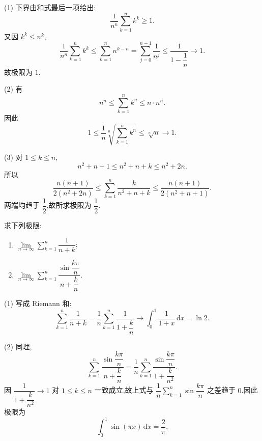 \begin{solution}

  (1) 下界由和式最后一项给出:
  \[
    \dfrac{1}{n^n}\sum\limits_{k=1}^n k^k\geq1.
  \]
  又因 $k^k\leq n^k$,
  \[
    \dfrac{1}{n^n}\sum\limits_{k=1}^n k^k
    \leq\sum\limits_{k=1}^n n^{k-n}
    =\sum\limits_{j=0}^{n-1}\dfrac{1}{n^j}
    \leq\dfrac{1}{1-\dfrac{1}{n}}\longrightarrow1.
  \]
  故极限为 $1$.

  (2) 有
  \[
    n^n\leq\sum\limits_{k=1}^n k^n\leq n\cdot n^n.
  \]
  因此
  \[
    1\leq\dfrac{1}{n}\sqrt[n]{\sum\limits_{k=1}^n k^n}\leq\sqrt[n]{n}\longrightarrow1.
  \]

  (3) 对 $1\leq k\leq n$,
  \[
    n^2+n+1\leq n^2+n+k\leq n^2+2n.
  \]
  所以
  \[
    \dfrac{n(n+1)}{2(n^2+2n)}
    \leq\sum\limits_{k=1}^n\dfrac{k}{n^2+n+k}
    \leq\dfrac{n(n+1)}{2(n^2+n+1)}.
  \]
  两端均趋于 $\dfrac{1}{2}$,故所求极限为 $\dfrac{1}{2}$.
\end{solution}




\begin{example}
  求下列极限:
  \begin{enumerate}
    \item $\displaystyle \lim\limits_{n\to\infty}\sum\limits_{k=1}^n\dfrac{1}{n+k}$;
    \item $\displaystyle \lim\limits_{n\to\infty}\sum\limits_{k=1}^n
            \dfrac{\sin\dfrac{k\pi}{n}}{n+\dfrac{k}{n}}$.
  \end{enumerate}
\end{example}
\exampleblank

\begin{solution}

  (1) 写成 Riemann 和:
  \[
    \displaystyle\sum\limits_{k=1}^n\dfrac{1}{n+k}
    =\dfrac{1}{n}\sum\limits_{k=1}^n\dfrac{1}{1+\dfrac{k}{n}}
    \longrightarrow\int_0^1\dfrac{1}{1+x}\,\mathrm{d}x=\ln2.
  \]

  (2) 同理,
  \[
    \displaystyle\sum\limits_{k=1}^n\dfrac{\sin\dfrac{k\pi}{n}}{n+\dfrac{k}{n}}
    =\dfrac{1}{n}\sum\limits_{k=1}^n
    \dfrac{\sin\dfrac{k\pi}{n}}{1+\dfrac{k}{n^2}}.
  \]
  因 $\dfrac{1}{1+\dfrac{k}{n^2}}\to1$ 对 $1\leq k\leq n$ 一致成立,故上式与
  $\displaystyle \dfrac{1}{n}\sum\limits_{k=1}^n\sin\dfrac{k\pi}{n}$ 之差趋于 $0$.因此极限为
  \[
    \displaystyle\int_0^1\sin(\pi x)\,\mathrm{d}x=\dfrac{2}{\pi}.
  \]
\end{solution}

